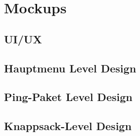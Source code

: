 \chapter{Mockups}

\section{UI/UX}

\section{Hauptmenu Level Design}

\section{Ping-Paket Level Design}

\section{Knappsack-Level Design}

